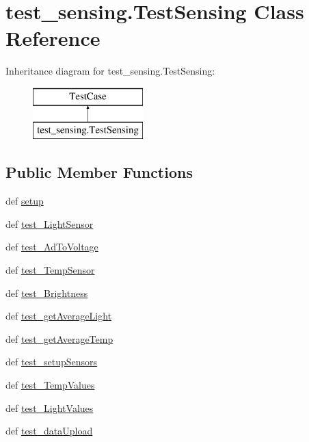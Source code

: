 \hypertarget{classtest__sensing_1_1_test_sensing}{\section{test\-\_\-sensing.\-Test\-Sensing Class Reference}
\label{classtest__sensing_1_1_test_sensing}
}
Inheritance diagram for test\-\_\-sensing.\-Test\-Sensing\-:\begin{figure}[H]
\begin{center}
\leavevmode
\includegraphics[height=2.000000cm]{classtest__sensing_1_1_test_sensing}
\end{center}
\end{figure}
\subsection*{Public Member Functions}
\begin{DoxyCompactItemize}
\item 
def \hyperlink{classtest__sensing_1_1_test_sensing_a8108831848700c03f289e756d849268b}{setup}
\item 
def \hyperlink{classtest__sensing_1_1_test_sensing_a0d1b334a31f4dea05ffd10d032069bd6}{test\-\_\-\-Light\-Sensor}
\item 
def \hyperlink{classtest__sensing_1_1_test_sensing_a802bdd98a70aa6a84a209086b12221a1}{test\-\_\-\-Ad\-To\-Voltage}
\item 
def \hyperlink{classtest__sensing_1_1_test_sensing_ac31ab35d2d8ef9a50d0e87f340334450}{test\-\_\-\-Temp\-Sensor}
\item 
def \hyperlink{classtest__sensing_1_1_test_sensing_a717dd22a6e75d4ee779e0166e94650e4}{test\-\_\-\-Brightness}
\item 
def \hyperlink{classtest__sensing_1_1_test_sensing_ab9941e0d91e0fe888370b944ce2b4268}{test\-\_\-get\-Average\-Light}
\item 
def \hyperlink{classtest__sensing_1_1_test_sensing_a5cd237ffd24b7488f396f51713c1e345}{test\-\_\-get\-Average\-Temp}
\item 
def \hyperlink{classtest__sensing_1_1_test_sensing_a187e4e99fb6891a9738a3d6adca0f81a}{test\-\_\-setup\-Sensors}
\item 
def \hyperlink{classtest__sensing_1_1_test_sensing_aa693842a90e63302ad1084786b463e4e}{test\-\_\-\-Temp\-Values}
\item 
def \hyperlink{classtest__sensing_1_1_test_sensing_a5d12277fd768c888e5c289368b1b9db3}{test\-\_\-\-Light\-Values}
\item 
def \hyperlink{classtest__sensing_1_1_test_sensing_a3f232e857f0b52f491838894d6341ff5}{test\-\_\-data\-Upload}
\end{DoxyCompactItemize}


